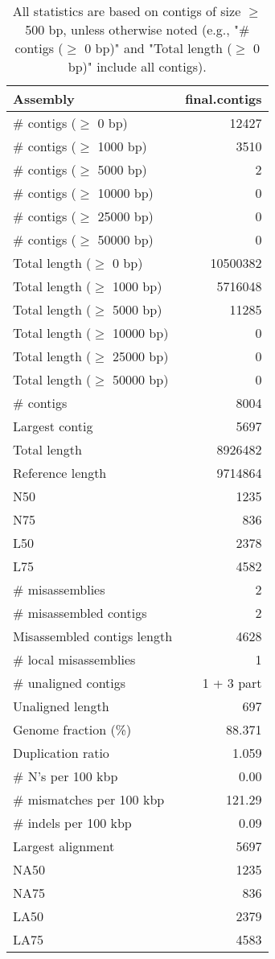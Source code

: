 \documentclass[12pt,a4paper]{article}
\begin{document}
\begin{table}[ht]
\begin{center}
\caption{All statistics are based on contigs of size $\geq$ 500 bp, unless otherwise noted (e.g., "\# contigs ($\geq$ 0 bp)" and "Total length ($\geq$ 0 bp)" include all contigs).}
\begin{tabular}{|l*{1}{|r}|}
\hline
Assembly & final.contigs \\ \hline
\# contigs ($\geq$ 0 bp) & 12427 \\ \hline
\# contigs ($\geq$ 1000 bp) & 3510 \\ \hline
\# contigs ($\geq$ 5000 bp) & 2 \\ \hline
\# contigs ($\geq$ 10000 bp) & 0 \\ \hline
\# contigs ($\geq$ 25000 bp) & 0 \\ \hline
\# contigs ($\geq$ 50000 bp) & 0 \\ \hline
Total length ($\geq$ 0 bp) & 10500382 \\ \hline
Total length ($\geq$ 1000 bp) & 5716048 \\ \hline
Total length ($\geq$ 5000 bp) & 11285 \\ \hline
Total length ($\geq$ 10000 bp) & 0 \\ \hline
Total length ($\geq$ 25000 bp) & 0 \\ \hline
Total length ($\geq$ 50000 bp) & 0 \\ \hline
\# contigs & 8004 \\ \hline
Largest contig & 5697 \\ \hline
Total length & 8926482 \\ \hline
Reference length & 9714864 \\ \hline
N50 & 1235 \\ \hline
N75 & 836 \\ \hline
L50 & 2378 \\ \hline
L75 & 4582 \\ \hline
\# misassemblies & 2 \\ \hline
\# misassembled contigs & 2 \\ \hline
Misassembled contigs length & 4628 \\ \hline
\# local misassemblies & 1 \\ \hline
\# unaligned contigs & 1 + 3 part \\ \hline
Unaligned length & 697 \\ \hline
Genome fraction (\%) & 88.371 \\ \hline
Duplication ratio & 1.059 \\ \hline
\# N's per 100 kbp & 0.00 \\ \hline
\# mismatches per 100 kbp & 121.29 \\ \hline
\# indels per 100 kbp & 0.09 \\ \hline
Largest alignment & 5697 \\ \hline
NA50 & 1235 \\ \hline
NA75 & 836 \\ \hline
LA50 & 2379 \\ \hline
LA75 & 4583 \\ \hline
\end{tabular}
\end{center}
\end{table}
\end{document}
